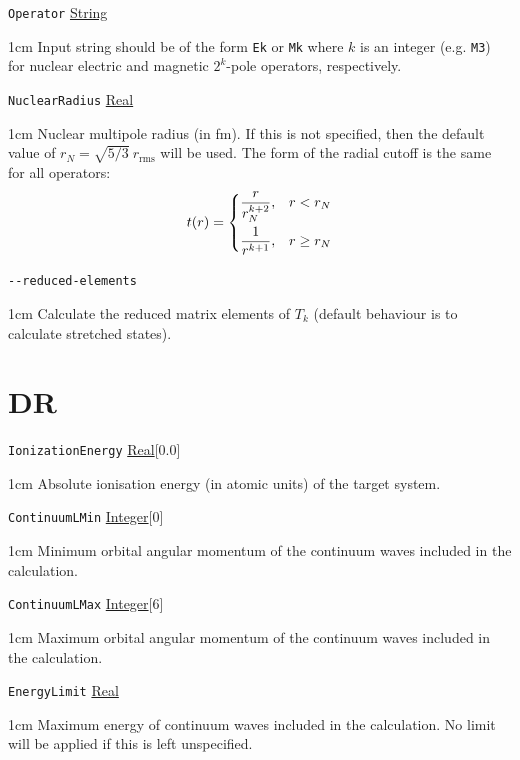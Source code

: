 \documentclass{report}
\begin{document}
\texttt{Operator} \uline{String}
\begin{adjustwidth}{1cm}{}
Input string should be of the form \texttt{Ek} or \texttt{Mk} where $k$ is an integer (e.g. \texttt{M3}) for nuclear electric and magnetic $2^k$-pole operators, respectively.
\end{adjustwidth}

\texttt{NuclearRadius} \uline{Real}
\begin{adjustwidth}{1cm}{}
Nuclear multipole radius (in fm). If this is not specified, then the default value of $r_N = \sqrt{5/3} ~ r_{\textrm{rms}}$ will be used. The form of the radial cutoff is the same for all operators:
\[
t(r) = \begin{dcases}
\frac{r}{r_N^{k+2}}, & r < r_N \\
\frac{1}{r^{k+1}}, & r \geq r_N \\
\end{dcases}
\]
\end{adjustwidth}

\texttt{{-}{-}reduced-elements} 
\begin{adjustwidth}{1cm}{}
	Calculate the reduced matrix elements of $T_k$ (default behaviour is to calculate stretched states).
\end{adjustwidth}
\section{DR} %

\texttt{IonizationEnergy} \uline{Real}[0.0]
\begin{adjustwidth}{1cm}{}
Absolute ionisation energy (in atomic units) of the target system.
\end{adjustwidth}

\texttt{ContinuumLMin} \uline{Integer}[0]
\begin{adjustwidth}{1cm}{}
Minimum orbital angular momentum of the continuum waves included in the calculation. 
\end{adjustwidth}

\texttt{ContinuumLMax} \uline{Integer}[6]
\begin{adjustwidth}{1cm}{}
Maximum orbital angular momentum of the continuum waves included in the calculation. 
\end{adjustwidth}

\texttt{EnergyLimit} \uline{Real}
\begin{adjustwidth}{1cm}{}
Maximum energy of continuum waves included in the calculation. No limit will be applied if this is left
unspecified.
\end{adjustwidth}
\end{document}

